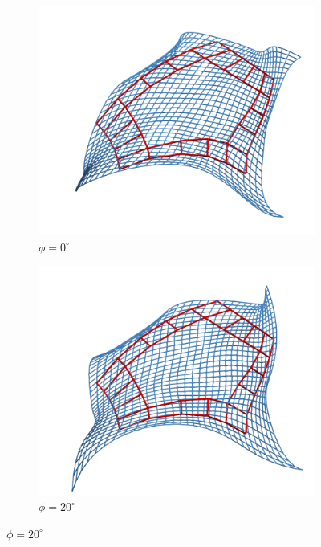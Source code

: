 \documentclass[9pt,academicons]{article}
\begin{document}
\begin{figure}[!ht]
  {
    \hfill
    \begin{subfigure}{.28\textwidth}
      \includegraphics[width=\textwidth]{images/rotations/00.png}
      \caption{$\phi=0^\circ$}
    \end{subfigure}
    \hfill
    \begin{subfigure}{.28\textwidth}
      \includegraphics[width=\textwidth]{images/rotations/20.png}
      \caption{$\phi=20^\circ$}
    \end{subfigure}
    \hfill
}
\end{figure}
\end{document}
